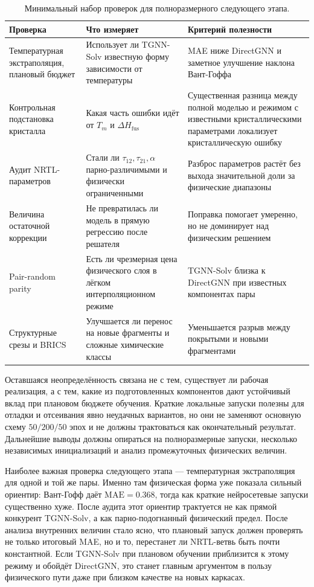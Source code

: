 \documentclass[11pt]{article}
\newcommand{\mae}{\mathrm{MAE}}
\theoremstyle{definition}
\begin{document}
\begin{table}[H]
\centering
\caption{Минимальный набор проверок для полноразмерного следующего этапа.}
\label{tab:next-validation-contract}
\small
\begin{tabularx}{\textwidth}{P{0.26\textwidth}Y P{0.25\textwidth}}
\toprule
Проверка & Что измеряет & Критерий полезности \\
\midrule
Температурная экстраполяция, плановый бюджет & Использует ли TGNN-Solv известную форму зависимости от температуры & MAE ниже DirectGNN и заметное улучшение наклона Вант-Гоффа \\
Контрольная подстановка кристалла & Какая часть ошибки идёт от $T_m$ и $\Delta H_{\mathrm{fus}}$ & Существенная разница между полной моделью и режимом с известными кристаллическими параметрами локализует кристаллическую ошибку \\
Аудит NRTL-параметров & Стали ли $\tau_{12},\tau_{21},\alpha$ парно-различимыми и физически ограниченными & Разброс параметров растёт без выхода значительной доли за физические диапазоны \\
Величина остаточной коррекции & Не превратилась ли модель в прямую регрессию после решателя & Поправка помогает умеренно, но не доминирует над физическим решением \\
Pair-random parity & Есть ли чрезмерная цена физического слоя в лёгком интерполяционном режиме & TGNN-Solv близка к DirectGNN при известных компонентах пары \\
Структурные срезы и BRICS & Улучшается ли перенос на новые фрагменты и сложные химические классы & Уменьшается разрыв между покрытыми и новыми фрагментами \\
\bottomrule
\end{tabularx}
\end{table}

Оставшаяся неопределённость связана не с тем, существует ли рабочая реализация, а с тем, какие из подготовленных компонентов дают устойчивый вклад при плановом бюджете обучения. Краткие локальные запуски полезны для отладки и отсеивания явно неудачных вариантов, но они не заменяют основную схему $50/200/50$ эпох и не должны трактоваться как окончательный результат. Дальнейшие выводы должны опираться на полноразмерные запуски, несколько независимых инициализаций и анализ промежуточных физических величин.

Наиболее важная проверка следующего этапа --- температурная экстраполяция для одной и той же пары. Именно там физическая форма уже показала сильный ориентир: Вант-Гофф даёт $\mae=0.368$, тогда как краткие нейросетевые запуски существенно хуже. После аудита этот ориентир трактуется не как прямой конкурент TGNN-Solv, а как парно-подогнанный физический предел. После анализа внутренних величин стало ясно, что плановый запуск должен проверять не только итоговый MAE, но и то, перестанет ли NRTL-ветвь быть почти константной. Если TGNN-Solv при плановом обучении приблизится к этому режиму и обойдёт DirectGNN, это станет главным аргументом в пользу физического пути даже при близком качестве на новых каркасах.
\end{document}
